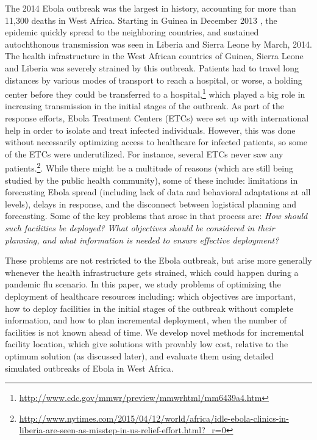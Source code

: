 

The 2014 Ebola outbreak was the largest in history, accounting for more than 11,300
deaths in West Africa. Starting in Guinea in December 2013 \cite{Baize2014}, 
the epidemic quickly spread to the neighboring countries,
and sustained autochthonous transmission was seen in Liberia and Sierra Leone
by March, 2014.  The health infrastructure in the West African countries of Guinea, Sierra Leone and Liberia
was severely strained by this outbreak. Patients had to travel long distances
by various modes of transport to reach a hospital, or worse, a holding center
before they could be transferred to a hospital,\footnote{%
\url{http://www.cdc.gov/mmwr/preview/mmwrhtml/mm6439a4.htm}}
which played a big role in increasing transmission in the initial stages of the outbreak.
As part of the response efforts,
Ebola Treatment Centers (ETCs) were set up with international help
in order to isolate and treat infected individuals.
However, this was done without necessarily
optimizing access to healthcare for infected patients, so some of the ETCs
were underutilized.  For instance, several
ETCs never saw any patients.\footnote{%
\url{http://www.nytimes.com/2015/04/12/world/africa/idle-ebola-clinics-in-liberia-are-seen-as-misstep-in-us-relief-effort.html?_r=0}}.
While there might be a multitude of reasons (which are still being studied by
the public health community), some of these include: limitations in forecasting
Ebola spread (including lack of data and behavioral adaptations at all levels), 
delays in response, and the disconnect between logistical planning and forecasting.
Some of the key problems that arose in that process are: \emph{How should
such facilities be deployed? What objectives should be considered in their planning,
and what information is needed to ensure effective deployment?}

These problems are not restricted to the Ebola outbreak, but arise more generally whenever
the health infrastructure gets strained, which could happen during a pandemic flu scenario.
In this paper, we study problems of optimizing the deployment of healthcare resources including:
which objectives are important, how to deploy facilities in the initial stages of the outbreak
without complete information, and how to plan incremental deployment, when the number
of facilities is not known ahead of time. We develop novel methods for incremental facility
location, which give solutions with provably low cost, relative to the optimum solution
(as discussed later), and evaluate them using detailed simulated outbreaks of
Ebola in West Africa.

